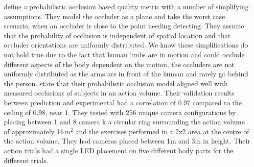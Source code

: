 \citet{chen2008occlusion} define a probabilistic occlusion based quality metric with a number of simplifying assumptions.
They model the occluder as a plane and take the worst case scenario, when an occluder is close to the point needing detecting. They assume that the probability of occlusion is independent of spatial location and that occluder orientations are uniformly distributed.
We know these simplifications do not hold true due to the fact that human limbs are in motion and could occlude different aspects of the body dependent on the motion, the occluders are not uniformly distributed as the arms are in front of the human and rarely go behind the person.
\citet{chen2008occlusion} state that their probabilistic occlusion model aligned well with measured occlusions of subjects in an action volume. Their validation results between prediction and experimental had a correlation of 0.97 compared to the ceiling of 0.98, near 1. They tested with 256 unique camera configurations by placing between 1 and 8 camera k a circular ring surrounding the action volume of approximately 16\,m$^2$ and the exercises performed in a 2x2 area at the centre of the action volume. They had cameras placed between 1m and 3m in height.
Their action trials had a single LED placement on five different body parts for the different trials.
